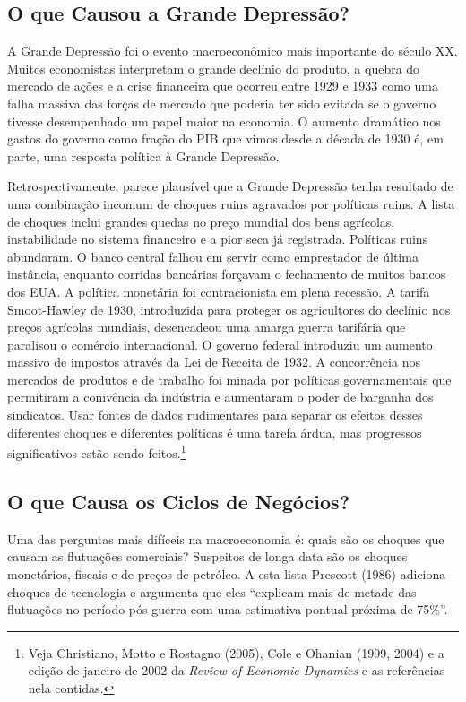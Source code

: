 \documentclass[12pt]{article}
\begin{document}
\subsection*{O que Causou a Grande Depressão?}

A Grande Depressão foi o evento macroeconômico mais importante do século XX. Muitos economistas interpretam o grande declínio do produto, a quebra do mercado de ações e a crise financeira que ocorreu entre 1929 e 1933 como uma falha massiva das forças de mercado que poderia ter sido evitada se o governo tivesse desempenhado um papel maior na economia. O aumento dramático nos gastos do governo como fração do PIB que vimos desde a década de 1930 é, em parte, uma resposta política à Grande Depressão.

Retrospectivamente, parece plausível que a Grande Depressão tenha resultado de uma combinação incomum de choques ruins agravados por políticas ruins. A lista de choques inclui grandes quedas no preço mundial dos bens agrícolas, instabilidade no sistema financeiro e a pior seca já registrada. Políticas ruins abundaram. O banco central falhou em servir como emprestador de última instância, enquanto corridas bancárias forçavam o fechamento de muitos bancos dos EUA. A política monetária foi contracionista em plena recessão. A tarifa Smoot-Hawley de 1930, introduzida para proteger os agricultores do declínio nos preços agrícolas mundiais, desencadeou uma amarga guerra tarifária que paralisou o comércio internacional. O governo federal introduziu um aumento massivo de impostos através da Lei de Receita de 1932. A concorrência nos mercados de produtos e de trabalho foi minada por políticas governamentais que permitiram a conivência da indústria e aumentaram o poder de barganha dos sindicatos. Usar fontes de dados rudimentares para separar os efeitos desses diferentes choques e diferentes políticas é uma tarefa árdua, mas progressos significativos estão sendo feitos.\footnote{Veja Christiano, Motto e Rostagno (2005), Cole e Ohanian (1999, 2004) e a edição de janeiro de 2002 da \textit{Review of Economic Dynamics} e as referências nela contidas.}

\subsection*{O que Causa os Ciclos de Negócios?}

Uma das perguntas mais difíceis na macroeconomia é: quais são os choques que causam as flutuações comerciais? Suspeitos de longa data são os choques monetários, fiscais e de preços de petróleo. A esta lista Prescott (1986) adiciona choques de tecnologia e argumenta que eles “explicam mais de metade das flutuações no período pós-guerra com uma estimativa pontual próxima de 75\%”.
\end{document}
